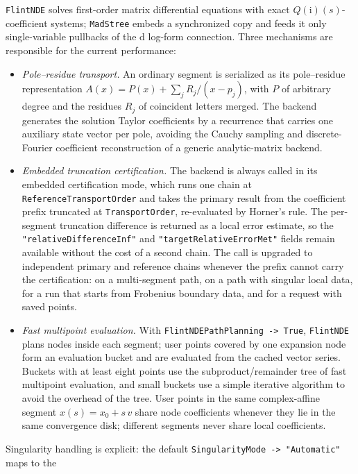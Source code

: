 \documentclass[11pt,a4paper]{article}
\newcommand{\ii}{\mathrm i}
\begin{document}
\texttt{FlintNDE} solves first-order matrix differential equations with exact
$Q(\ii)(s)$-coefficient systems; \texttt{MadStree} embeds a synchronized copy and
feeds it only single-variable pullbacks of the d log-form connection. Three mechanisms are responsible
for the current performance:
\begin{itemize}
  \item \emph{Pole--residue transport.} An ordinary segment is serialized as its pole--residue
        representation $A(x)=P(x)+\sum_jR_j/(x-p_j)$, with $P$ of arbitrary degree and the residues
        $R_j$ of coincident letters merged. The backend generates the solution Taylor coefficients
        by a recurrence that carries one auxiliary state vector per pole, avoiding the Cauchy sampling
        and discrete-Fourier coefficient reconstruction of a generic analytic-matrix backend.
  \item \emph{Embedded truncation certification.} The backend is always called in its embedded
        certification mode, which runs one chain at \texttt{ReferenceTransportOrder} and takes the
        primary result from the coefficient prefix truncated at \texttt{TransportOrder}, re-evaluated
        by Horner's rule. The per-segment truncation difference is returned as a local error estimate,
        so the \texttt{"relativeDifferenceInf"} and \texttt{"targetRelativeErrorMet"} fields remain
        available without the cost of a second chain. The call is upgraded to independent primary and
        reference chains whenever the prefix cannot carry the certification: on a multi-segment path,
        on a path with singular local data, for a run that starts from Frobenius boundary data, and
        for a request with saved points.
  \item \emph{Fast multipoint evaluation.} With \texttt{FlintNDEPathPlanning -> True}, \texttt{FlintNDE}
        plans nodes inside each segment; user points covered by one expansion node form an
        evaluation bucket and are evaluated from the cached vector series. Buckets with at least
        eight points use the subproduct/remainder tree of fast multipoint evaluation, and small
        buckets use a simple iterative algorithm to avoid the overhead of the tree. User points in the same
        complex-affine segment $x(s)=x_0+s\,v$ share node coefficients whenever they lie in the same
        convergence disk; different segments never share local coefficients.
\end{itemize}
Singularity handling is explicit: the default \texttt{SingularityMode -> "Automatic"} maps to the
\end{document}
